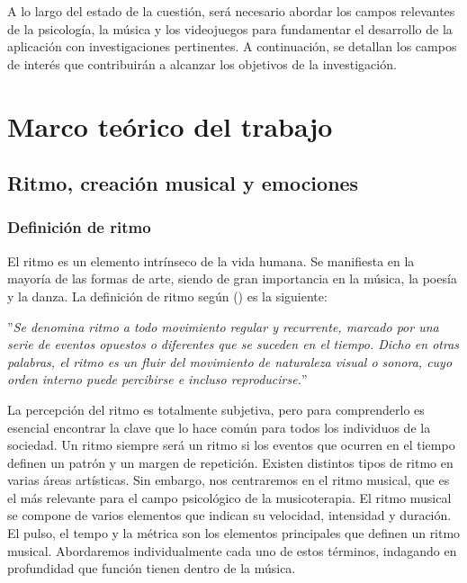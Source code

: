A lo largo del estado de la cuestión, será necesario abordar los campos relevantes de la psicología, la música y los videojuegos para fundamentar el desarrollo de la aplicación con investigaciones pertinentes. A continuación, se detallan los campos de interés que contribuirán a alcanzar los objetivos de la investigación.

\section{Marco teórico del trabajo}

\subsection{Ritmo, creación musical y emociones}

\subsubsection{Definición de ritmo}

El ritmo es un elemento intrínseco de la vida humana. Se manifiesta en la mayoría de las formas de arte, siendo de gran importancia en la música, la poesía y la danza. La definición de ritmo según \citeauthor{CONCEPTO:2021} (\citeyear{CONCEPTO:2021}) es la siguiente:

\begin{adjustwidth}{100pt}{0pt}
	''\textit{Se denomina ritmo a todo movimiento regular y recurrente, marcado por una serie de eventos opuestos o diferentes que se suceden en el tiempo. Dicho en otras palabras, el ritmo es un fluir del movimiento de naturaleza visual o sonora, cuyo orden interno puede percibirse e incluso reproducirse.}''
\end{adjustwidth}

La percepción del ritmo es totalmente subjetiva, pero para comprenderlo es esencial encontrar la clave que lo hace común para todos los individuos de la sociedad. Un ritmo siempre será un ritmo si los eventos que ocurren en el tiempo definen un patrón y un margen de repetición. Existen distintos tipos de ritmo en varias áreas artísticas. Sin embargo, nos centraremos en el ritmo musical, que es el más relevante para el campo psicológico de la musicoterapia. El ritmo musical se compone de varios elementos que indican su velocidad, intensidad y duración. El pulso, el tempo y la métrica son los elementos principales que definen un ritmo musical. Abordaremos individualmente cada uno de estos términos, indagando en profundidad que función tienen dentro de la música.

